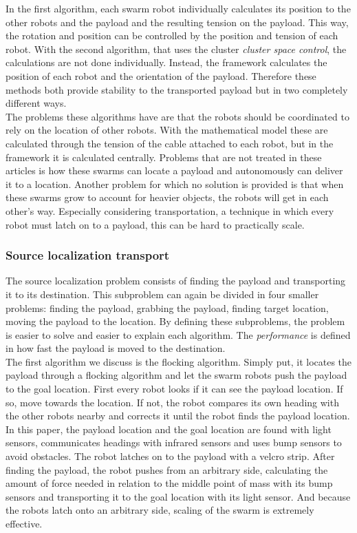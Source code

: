 In the first algorithm, each swarm robot individually calculates its position to the other robots and the payload and the resulting tension on the payload. 
This way, the rotation and position can be controlled by the position and tension of each robot. 
With the second algorithm, that uses the cluster \emph{cluster space control}, the calculations are not done individually. 
Instead, the framework calculates the position of each robot and the orientation of the payload. 
Therefore these methods both provide stability to the transported payload but in two completely different ways. \\

The problems these algorithms have are that the robots should be coordinated to rely on the location of other robots.
With the mathematical model these are calculated through the tension of the cable attached to each robot, but in the framework it is calculated centrally. 
Problems that are not treated in these articles is how these swarms can locate a payload and autonomously can deliver it to a location. 
Another problem for which no solution is provided is that when these swarms grow to account for heavier objects, the robots will get in each other's way. 
Especially considering transportation, a technique in which every robot must latch on to a payload, this can be hard to practically scale. 

\subsubsection{Source localization transport}
The source localization problem consists of finding the payload and transporting it to its destination.
This subproblem can again be divided in four smaller problems: finding the payload, grabbing the payload, finding target location, moving the payload to the location.
By defining these subproblems, the problem is easier to solve and easier to explain each algorithm. 
The \emph{performance} is defined in how fast the payload is moved to the destination. \\

The first algorithm we discuss is the flocking algorithm. \cite{Rubenstein2013collecive}
Simply put, it locates the payload through a flocking algorithm and let the swarm robots push the payload to the goal location. 
First every robot looks if it can see the payload location. If so, move towards the location. 
If not, the robot compares its own heading with the other robots nearby and corrects it until the robot finds the payload location.
In this paper, the payload location and the goal location are found with light sensors, communicates headings with infrared sensors and uses bump sensors to avoid obstacles. 
The robot latches on to the payload with a velcro strip.
After finding the payload, the robot pushes from an arbitrary side, calculating the amount of force needed in relation to the middle point of mass with its bump sensors and transporting it to the goal location with its light sensor.  
And because the robots latch onto an arbitrary side, scaling of the swarm is extremely effective. \\ 

